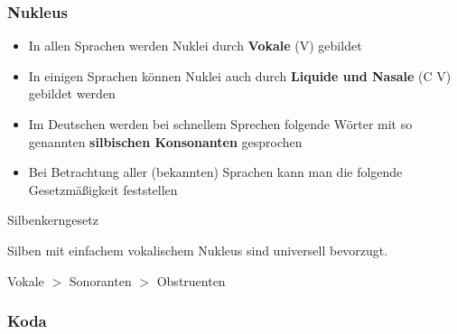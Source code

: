 \begin{frame}
\frametitle{Nukleus}

\begin{itemize}

	\item In allen Sprachen werden Nuklei durch \textbf{Vokale} (V) gebildet
	
	\item In einigen Sprachen können Nuklei auch durch \textbf{Liquide und Nasale} (C \ras V) gebildet werden


	
	\item Im Deutschen werden bei schnellem Sprechen folgende Wörter mit so genannten \textbf{silbischen Konsonanten} gesprochen
	
	
          \ea
           \textipa{[le:.z\textsyllabic{n}]} %
          \z
          
          \ea
           
          \z

	\item Bei Betrachtung aller (bekannten) Sprachen kann man die folgende Gesetzmäßigkeit feststellen \citep[cf.][217f.]{Hall00a}

\end{itemize}
	
	\begin{block}{Silbenkerngesetz}
	
	Silben mit einfachem vokalischem Nukleus sind universell bevorzugt.
	
	Vokale $>$ Sonoranten $>$ Obstruenten 
	
	\end{block}
	
\end{frame}



\subsubsection{Koda}

